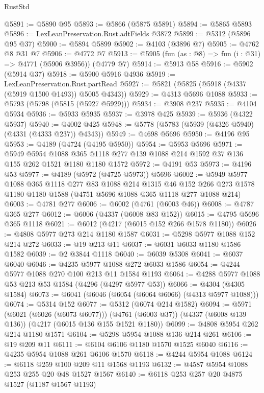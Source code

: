 \begin{lexlean}{RustStd}
\begin{coremodule}
{\begin{coremodule}
{{{{{{{{{{{{{{{{{{{{{{{{{{{{{{{{@5891 := @5890 @95
@5893 := @5866 (@5875 @5891)
@5894 := @5865 @5893
@5896 := LexLeanPreservation.Rust.adtFields @3872
@5899 := @5312 (@5896 @95 @37)
@5900 := @5894 @5899
@5902 := @4103 (@3896 @7)
@5905 := @4762 @8 @31 @7
@5906 := @4772 @7
@5913 := @5905 (fun (as : @8) => fun (i : @31) => @4771 (@5906 @3956)) (@4779 @7)
@5914 := @5913 @58
@5916 := @5902 (@5914 @37)
@5918 := @5900 @5916 @4936
@5919 := LexLeanPreservation.Rust.partRead
@5927 := @5821 (@5825 (@5918 (@4337 (@5919 @1500 @1493)) @5005 @4343))
@5929 := @4313 @5696 @1088
@5933 := @5793 (@5798 (@5815 (@5927 @5929)))
@5934 := @3908 @237
@5935 := @4104 @5934
@5936 := @5933 @5935
@5937 := @3978 @425
@5939 := @5936 (@4322 @5937)
@5940 := @4002 @425
@5948 := @5778 (@5783 (@5939 (@4326 @5940) (@4331 (@4333 @237)) @4343))
@5949 := @4698 @5696
@5950 := @4196 @95
@5953 := @4189 (@4724 (@4195 @5950))
@5954 := @5953 @5696
@5971 := @5949
    @5954
    @1088
    @365
    @1118
    @277
    @139
    @1088
    @214
    @1592
    @37
    @136
    @155
    @262
    @1521
    @1180
    @1180
    @1572
@5972 := @4191 @53
@5973 := @4196 @53
@5977 := @4189 (@5972 (@4725 @5973)) @5696
@6002 := @5949
    @5977
    @1088
    @365
    @1118
    @277
    @83
    @1088
    @214
    @1315
    @46
    @152
    @266
    @273
    @1578
    @1180
    @1180
    @1588
    (@4751 @5696 @1088 @365 @1118 @277 @1088 @214)
@6003 := @4781 @277
@6006 := @6002 (@4761 (@6003 @46))
@6008 := @4787 @365 @277
@6012 := @6006 (@4337 (@6008 @83 @152))
@6015 := @4795 @5696 @365 @1118
@6021 := @6012 (@4217 (@6015 @152 @266 @1578 @1180))
@6026 := @4808 @5977 @273 @214 @1180 @1587
@6031 := @5298 @5977 @1088 @152 @214 @272
@6033 := @19 @213 @11
@6037 := @6031 @6033 @1180 @1586 @1582
@6039 := @2 @3844 @1118
@6040 := @6039 @5308
@6041 := @6037 @6040
@6046 := @4235 @5977 @1088 @272 @6033 @1586
@6054 := @4244 @5977 @1088 @270 @100 @213 @11 @1584 @1193
@6064 := @4288 @5977 @1088 @53 @213 @53 @1584 (@4296 (@4297 @5977 @53))
@6066 := @4304 (@4305 @1584)
@6073 := @6041 (@6046 (@6054 (@6064 @6066) (@4313 @5977 @1088)))
@6074 := @5314 @152
@6077 := @5312 (@6074 @214 @1582)
@6094 := @5971
    (@6021 (@6026 (@6073 @6077)))
    (@4761 (@6003 @37))
    (@4337 (@6008 @139 @136))
    (@4217 (@6015 @136 @155 @1521 @1180))
@6099 := @4808 @5954 @262 @214 @1180 @1571
@6104 := @5298 @5954 @1088 @136 @214 @261
@6106 := @19 @209 @11
@6111 := @6104 @6106 @1180 @1570 @1525 @6040
@6116 := @4235 @5954 @1088 @261 @6106 @1570
@6118 := @4244 @5954 @1088
@6124 := @6118 @259 @100 @209 @11 @1568 @1193
@6132 := @4587 @5954 @1088 @253 @255 @20 @48 @1527 @1567
@6140 := @6118 @253 @257 @20 @4875 @1527 (@1187 @1567 @1193)
}}}}}}}}}}}}}}}}}}}}}}}}}}}}}}}}
\end{coremodule}}
\end{coremodule}
\end{lexlean}
